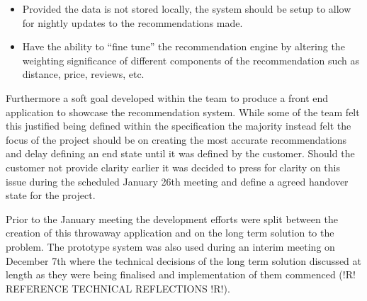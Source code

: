 \documentclass{l3proj}
\begin{document}
\begin{itemize}
\item Provided the data is not stored locally, the system should be setup to allow for nightly updates to the recommendations made.
\item Have the ability to “fine tune” the recommendation engine by altering the weighting significance of different components of the recommendation such as distance, price, 
reviews, etc.
\end{itemize}

Furthermore a soft goal developed within the team to produce a front end application to showcase the recommendation system. While some of the team felt this justified being defined within the specification the majority instead felt the focus of the project should be on creating the most accurate recommendations and delay defining an end state until it was defined by the customer. Should the customer not provide clarity earlier it was decided to press for clarity on this issue during the scheduled January 26th meeting and define a agreed handover state for the project.

Prior to the January meeting the development efforts were split between the creation of this throwaway application and on the long term solution to the problem. The prototype system was also used during an interim meeting on December 7th where the technical decisions of the long term solution discussed at length as they were being finalised and implementation of them commenced (!R! REFERENCE TECHNICAL REFLECTIONS !R!).  



\end{document}
